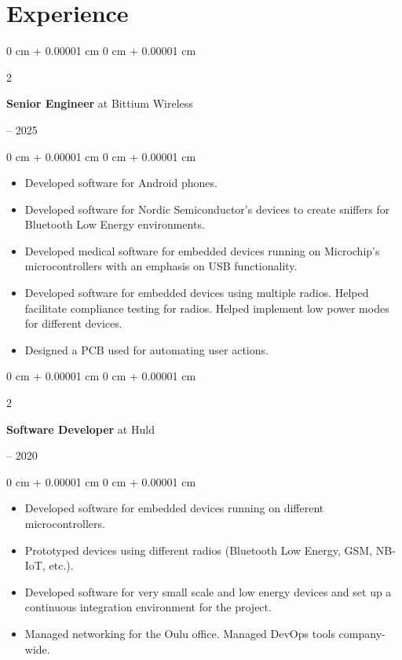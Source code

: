 \documentclass{article}
\newenvironment{highlights}{
    \begin{itemize}[
        topsep=0.10 cm,
        parsep=0.10 cm,
        partopsep=0pt,
        itemsep=0pt,
        leftmargin=0 cm + 10pt
    ]
}{
    \end{itemize}
}
\newenvironment{onecolentry}{
    \begin{adjustwidth}{
        0 cm + 0.00001 cm
    }{
        0 cm + 0.00001 cm
    }
}{
    \end{adjustwidth}
}
\newenvironment{twocolentry}[2][]{
    \onecolentry
    \def\secondColumn{#2}
    \setcolumnwidth{\fill, 4.5 cm}
    \begin{paracol}{2}
}{
    \switchcolumn \raggedleft \secondColumn
    \end{paracol}
    \endonecolentry
}
\begin{document}
  \section{Experience}
    \begin{twocolentry}{2020 -- 2025}
      \textbf{Senior Engineer} at Bittium Wireless
    \end{twocolentry}
    \vspace{0.1 cm}
    \begin{onecolentry}
      \begin{highlights}
        \item Developed software for Android phones.
        \item Developed software for Nordic Semiconductor's devices to create sniffers for Bluetooth Low Energy environments.
        \item Developed medical software for embedded devices running on Microchip's microcontrollers with an emphasis on USB functionality.
        \item Developed software for embedded devices using multiple radios. Helped facilitate compliance testing for radios. Helped implement low power modes for different devices.
        \item Designed a PCB used for automating user actions.
      \end{highlights}
    \end{onecolentry}
    \vspace{0.3 cm}
    \begin{twocolentry}{2017 -- 2020}
      \textbf{Software Developer} at Huld
    \end{twocolentry}
    \vspace{0.1 cm}
    \begin{onecolentry}
      \begin{highlights}
        \item Developed software for embedded devices running on different microcontrollers.
        \item Prototyped devices using different radios (Bluetooth Low Energy, GSM, NB-IoT, etc.).
        \item Developed software for very small scale and low energy devices and set up a continuous integration environment for the project.
        \item Managed networking for the Oulu office. Managed DevOps tools company-wide.
      \end{highlights}
    \end{onecolentry}
    \vspace{0.3 cm}
\end{document}
